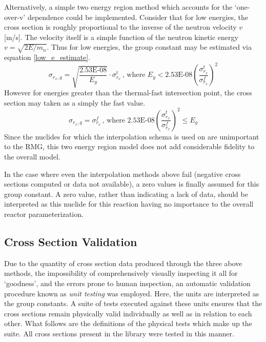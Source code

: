 Alternatively, a simple two energy region method which accounts for the `one-over-v' dependence
could be implemented.  Consider that for low energies, the cross section is roughly proportional 
to the inverse of the neutron velocity $v$ [m/s].  The velocity itself is a simple function of 
the neutron kinetic energy $v = \sqrt{2E/m_n}$.  Thus for low energies, the group constant may 
be estimated via equation \ref{low_e_estimate}.
\begin{equation}
\label{low_e_estimate}
\sigma_{r_x,g} = \sqrt{\frac{\mbox{2.53E-08}}{E_g}} \cdot \sigma_{r_x}^t \, \mbox{, where } E_g < \mbox{2.53E-08} \left(\frac{\sigma_{r_x}^t}{\sigma_{r_x}^f}\right)^2
\end{equation}
However for energies greater than the thermal-fast intersection point, the cross section may taken as 
a simply the fast value.
\begin{equation}
\label{low_e_estimate}
\sigma_{r_x,g} = \sigma_{r_x}^f \, \mbox{, where } \mbox{2.53E-08} \left(\frac{\sigma_{r_x}^t}{\sigma_{r_x}^f}\right)^2 \le E_g
\end{equation}
Since the nuclides for which the interpolation schema is used on are unimportant to the RMG,  
this two energy region model does not add considerable fidelity to the overall model.

In the case where even the interpolation methods above fail (negative cross sections computed or 
data not available), a zero values is finally assumed for this group constant.  A zero value, rather 
than indicating a lack of data, should be interpreted as this nuclide for this reaction having no
importance to the overall reactor parameterization.

\subsection{Cross Section Validation}
\label{mg:xs_validation}
Due to the quantity of cross section data produced through the three above methods, the 
impossibility of comprehensively visually inspecting it all for `goodness', and the errors 
prone to human inspection, an automatic validation procedure known as \emph{unit testing}
was employed.  Here, the units are interpreted as the group constants.   A suite of tests 
executed against these units ensures that the cross sections remain physically valid 
individually as well as in relation to each other. What follows are the definitions of the 
physical tests which make up the suite.  All cross sections present in the library were tested 
in this manner.

